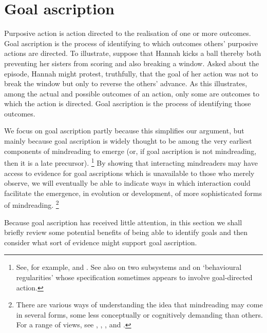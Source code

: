 \documentclass[12pt,\papersize]{extarticle}
\begin{document}
\section{Goal ascription}
Purposive action is action directed to the realisation of one or more outcomes.
Goal ascription is the process of identifying to which outcomes others' purposive actions are directed.
To illustrate, suppose that
Hannah kicks a ball thereby both preventing her sisters from scoring and also breaking a window.
Asked about the episode,
Hannah might protest, truthfully, that the goal of her action was not to break the window but only to reverse the others' advance.
As this illustrates,
among the actual and possible outcomes of an action,
only some are outcomes to which the action is directed.
Goal ascription is the process of identifying 
 those outcomes.

We focus on goal ascription 
partly because this simplifies our argument,
but mainly because goal ascription is widely thought to be among the very earliest components of mindreading to emerge (or, if goal ascription is not mindreading, then it is a late precursor).%
\footnote{
See, for example,
\citet{Gergely:1995sq} and 
\citet{Woodward:1998dm}.
See also
\citet[p.\ 111, Box 1]{Baillargeon:gx}
on two subsystems
and 
\citet{Povinelli:2001jf} on `behavioural regularities' whose specification sometimes appears to involve goal-directed action.
}
By showing that
  interacting mindreaders may have access to 
  evidence for goal ascriptions 
  which is unavailable to those who merely observe,
we will eventually be able to indicate ways in which interaction could facilitate the emergence, in evolution or development, of more sophisticated forms of mindreading.%
\footnote{
There are various ways of understanding the idea that mindreading may come in several forms, some less conceptually or cognitively demanding than others.
For a range of views, see
 \citet{Apperly:2009ju},
 \citet{Call:2005qe},
 \citet{Doherty:2006wz},
 \citet{ONeill:2005ff}
 and
 \citet{Wellman:2001if}.
}

Because goal ascription has received little attention,
in this section
we shall 
briefly review some potential benefits of being able to identify goals
and then 
consider what sort of evidence might support goal ascription.
\end{document}
